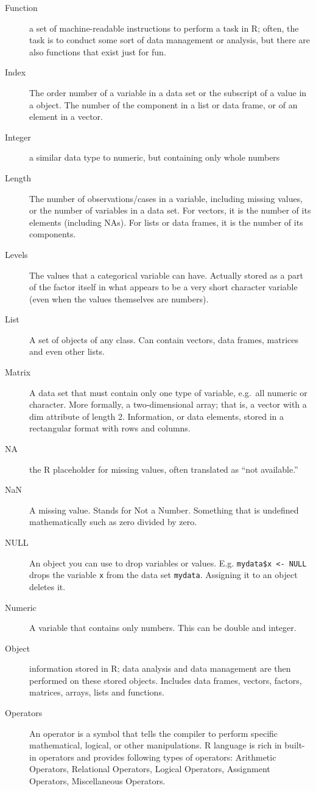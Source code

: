 \documentclass[
]{book}
\begin{document}
\begin{description}
\item[Function]
a set of machine-readable instructions to perform a task in R; often, the task is to conduct some sort of data management or analysis, but there are also functions that exist just for fun.
\item[Index]
The order number of a variable in a data set or the subscript of a value in a object. The number of the component in a list or data frame, or of an element in a vector.
\item[Integer]
a similar data type to numeric, but containing only whole numbers
\item[Length]
The number of observations/cases in a variable, including missing values, or the number of variables in a data set. For vectors, it is the number of its elements (including NAs). For lists or data frames, it is the number of its components.
\item[Levels]
The values that a categorical variable can have. Actually stored as a part of the factor itself in what appears to be a very short character variable (even when the values themselves are numbers).
\item[List]
A set of objects of any class. Can contain vectors, data frames, matrices and even other lists.
\item[Matrix]
A data set that must contain only one type of variable, e.g.~all numeric or character. More formally, a two-dimensional array; that is, a vector with a dim attribute of length 2. Information, or data elements, stored in a rectangular format with rows and columns.
\item[NA]
the R placeholder for missing values, often translated as ``not available.''
\item[NaN]
A missing value. Stands for Not a Number. Something that is undefined mathematically such as zero divided by zero.
\item[NULL]
An object you can use to drop variables or values. E.g. \texttt{mydata\$x\ \textless{}-\ NULL} drops the variable \texttt{x} from the data set \texttt{mydata}. Assigning it to an object deletes it.
\item[Numeric]
A variable that contains only numbers. This can be double and integer.
\item[Object]
information stored in R; data analysis and data management are then performed on these stored objects. Includes data frames, vectors, factors, matrices, arrays, lists and functions.
\item[Operators]
An operator is a symbol that tells the compiler to perform specific mathematical, logical, or other manipulations. R language is rich in built-in operators and provides following types of operators: Arithmetic Operators, Relational Operators, Logical Operators, Assignment Operators, Miscellaneous Operators.

\end{description}
\end{document}
